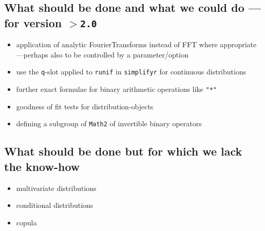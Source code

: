 \documentclass[11pt]{article}
\newcommand{\code}[1]{{\tt #1}}
\newcommand{\pkgversion}{{\tt 2.0}}
\begin{document}
\subsection[What should be done and what we could do]%
{What should be done and what we could do ---for version $>$\pkgversion}
\begin{itemize}
\item application of analytic FourierTransforms instead of FFT where
appropriate ---perhaps also to be controlled
by a parameter/option
\item use the \code{q}-slot applied to \code{runif} in \code{simplifyr} 
for continuous distributions
\item further exact formulae for binary arithmetic operations like \code{"*"}
\item goodness of fit tests for distribution-objects
\item defining a subgroup of \code{Math2} of invertible binary operators
\end{itemize}
\subsection{What should be done but for which we lack the know-how}
\begin{itemize}
  \item multivariate distributions
  \item conditional distributions
  \item copula
\end{itemize}
%
\end{document}
